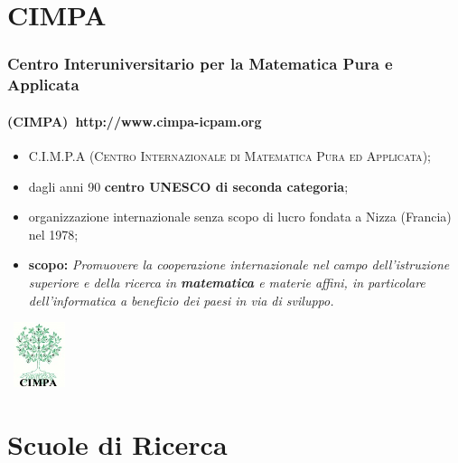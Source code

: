 \documentclass[10pt,final]{beamer} %
\date{October 23-24, 2013}
\title[La matematica per la cooperazione]{\insertlecture}
\subtitle{\ }
\begin{document}
\begin{frame}
\titlepage
\end{frame}


\section{CIMPA}

\begin{frame}\frametitle{Centro Interuniversitario per la Matematica Pura e Applicata}
\framesubtitle{ (CIMPA)\ http://www.cimpa-icpam.org}

\begin{itemize}
 \item C.I.M.P.A (\textsc{Centro Internazionale di Matematica Pura ed Applicata});
\item dagli anni 90 \textbf{centro UNESCO di seconda categoria};
\item organizzazione internazionale senza scopo di lucro fondata a Nizza (Francia) nel 1978;
\item \textbf{scopo:} 
\textit{Promuovere la cooperazione internazionale nel campo dell'istruzione superiore 
e della ricerca in \textbf{matematica} e materie affini, in particolare dell'informatica a beneficio dei paesi in via di sviluppo.}
\end{itemize}
\hfill\ \includegraphics[width=1.5cm]{logo-cimpa.jpeg}
\end{frame}
\section{Scuole di Ricerca}
\end{document}
